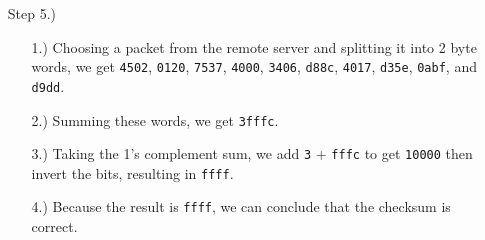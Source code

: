 \documentclass[12pt]{article}
\begin{document}
\begin{itemize}
\begin{center}
        \end{center}

        \item [Step 5.)] \begin{itemize}
            \item [1.)] Choosing a packet from the remote server and splitting
            it into 2 byte words, we get \verb|4502|, \verb|0120|, \verb|7537|,
            \verb|4000|, \verb|3406|, \verb|d88c|, \verb|4017|, \verb|d35e|,
            \verb|0abf|, and \verb|d9dd|.

            \item [2.)] Summing these words, we get \verb|3fffc|.

            \item [3.)] Taking the 1's complement sum, we add \verb|3| + \verb|fffc|
            to get \verb|10000| then invert the bits, resulting in \verb|ffff|.

            \item [4.)] Because the result is \verb|ffff|, we can conclude that the
            checksum is correct.
        \end{itemize}
    \end{itemize}
\end{document}
